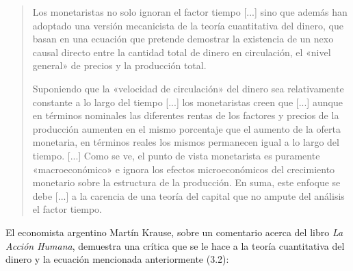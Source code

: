 \documentclass[12pt,a4paper,twoside]{book}
\begin{document}
\begin{quotation}
Los monetaristas no solo ignoran el factor tiempo [...] sino que además han adoptado una versión mecanicista de la teoría cuantitativa del dinero, que basan en una ecuación que pretende demostrar la existencia de un nexo causal directo entre la cantidad total de dinero en circulación, el «nivel general» de precios y la producción total.

Suponiendo que la «velocidad de circulación» del dinero sea relativamente constante a lo largo del tiempo [...] los monetaristas creen que [...] aunque en términos nominales las diferentes rentas de los factores y precios de la producción aumenten en el mismo porcentaje que el aumento de la oferta monetaria, en términos reales los mismos permanecen igual a lo largo del tiempo. [...] Como se ve, el punto de vista monetarista es puramente «macroeconómico» e ignora los efectos microeconómicos del crecimiento monetario sobre la estructura de la producción. En suma, este enfoque se debe [...] a la carencia de una teoría del capital que no ampute del análisis el factor tiempo. \cite[págs. 407-408]{huertasoto:dinero}
\end{quotation}

El economista argentino Martín Krause, sobre un comentario acerca del libro \textit{La Acción Humana}, demuestra una crítica que se le hace a la teoría cuantitativa del dinero y la ecuación mencionada anteriormente (3.2):
\end{document}
